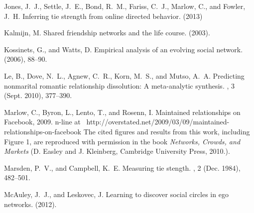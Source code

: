 \documentclass{sigchi}
\begin{document}
\begin{thebibliography}{10}
Jones, J.~J., Settle, J.~E., Bond, R.~M., Fariss, C.~J., Marlow, C., and
  Fowler, J.~H.
\newblock Inferring tie strength from online directed behavior.
 (2013) %

Kalmijn, M.
\newblock Shared friendship networks and the life course. 
 (2003). %


Kossinets, G., and Watts, D.
\newblock Empirical analysis of an evolving social network.
 (2006), 88--90.

Le, B., Dove, N.~L., Agnew, C.~R., Korn, M.~S., and Mutso, A.~A.
\newblock Predicting nonmarital romantic relationship dissolution: A
  meta-analytic synthesis.
, 3 (Sept. 2010), 377--390.


Marlow, C., Byron, L., Lento, T., and Rosenn, I.
\newblock Maintained relationships on {Facebook}, 2009.
n-line at {
  {\footnotesize \mbox{\hspace*{-12pt} http://overstated.net/2009/03/09/maintained-relationships-on-facebook} }}
  The
  cited figures and results from this work, including Figure 1, are reproduced
  with permission
  in the book {\em Networks, Crowds, and Markets} (D. Easley and J. Kleinberg,
  Cambridge University Press, 2010.).

Marsden, P.~V., and Campbell, K.~E.
\newblock Measuring tie stength.
, 2 (Dec. 1984), 482--501.

McAuley, J.~J., and Leskovec, J.
\newblock Learning to discover social circles in ego networks.
 (2012). %


\end{thebibliography}
\end{document}
